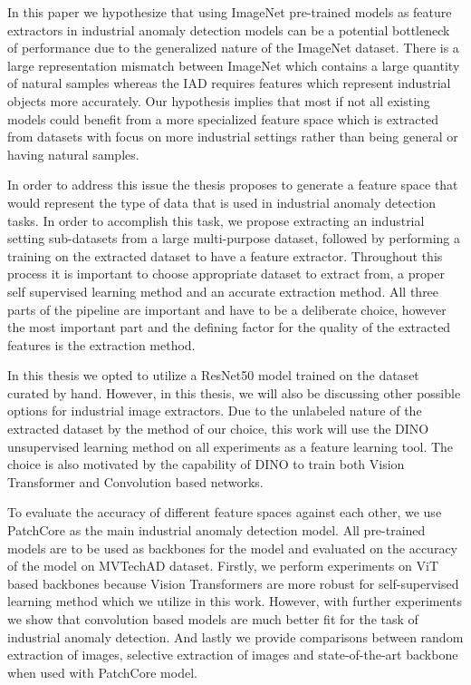 In this paper we hypothesize that using ImageNet pre-trained models as feature extractors in industrial anomaly detection models can be a potential bottleneck of performance due to the generalized nature of the ImageNet dataset. There is a large representation mismatch between ImageNet which contains a large quantity of natural samples whereas the IAD requires features which represent industrial objects more accurately. Our hypothesis implies that most if not all existing models could benefit from a more specialized feature space which is extracted from datasets with focus on more industrial settings rather than being general or having natural samples.

In order to address this issue the thesis proposes to generate a feature space that would represent the type of data that is used in industrial anomaly detection tasks. In order to accomplish this task, we propose extracting an industrial setting sub-datasets from a large multi-purpose dataset, followed by performing a training on the extracted dataset to have a feature extractor. Throughout this process it is important to choose appropriate dataset to extract from, a proper self supervised learning method and an accurate extraction method. All three parts of the pipeline are important and have to be a deliberate choice, however the most important part and the defining factor for the quality of the extracted features is the extraction method.

In this thesis we opted to utilize a ResNet50 model trained on the dataset curated by hand. However, in this thesis, we will also be discussing other possible options for industrial image extractors. Due to the unlabeled nature of the extracted dataset by the method of our choice, this work will use the DINO unsupervised learning method on all experiments as a feature learning tool. The choice is also motivated by the capability of DINO to train both Vision Transformer and Convolution based networks.

To evaluate the accuracy of different feature spaces against each other, we use PatchCore as the main industrial anomaly detection model. All pre-trained models are to be used as backbones for the model and evaluated on the accuracy of the model on MVTechAD dataset. Firstly, we perform experiments on ViT based backbones because Vision Transformers are more robust for self-supervised learning method which we utilize in this work. However, with further experiments we show that convolution based models are much better fit for the task of industrial anomaly detection. And lastly we provide comparisons between random extraction of images, selective extraction of images and state-of-the-art backbone when used with PatchCore model.

